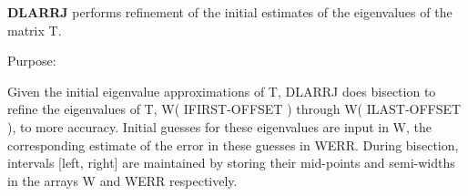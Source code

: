 {\bfseries D\+L\+A\+R\+R\+J} performs refinement of the initial estimates of the eigenvalues of the matrix T. 

 \begin{DoxyParagraph}{Purpose\+: }
\begin{DoxyVerb} Given the initial eigenvalue approximations of T, DLARRJ
 does  bisection to refine the eigenvalues of T,
 W( IFIRST-OFFSET ) through W( ILAST-OFFSET ), to more accuracy. Initial
 guesses for these eigenvalues are input in W, the corresponding estimate
 of the error in these guesses in WERR. During bisection, intervals
 [left, right] are maintained by storing their mid-points and
 semi-widths in the arrays W and WERR respectively.\end{DoxyVerb}
 
\end{DoxyParagraph}

